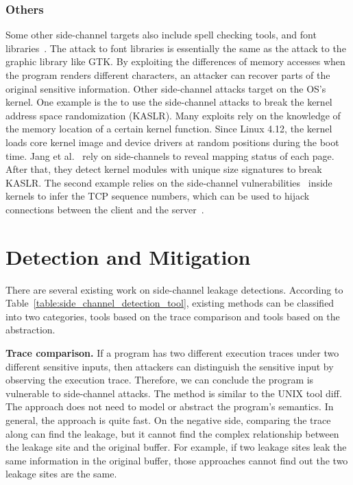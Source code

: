 \subsubsection{Others}
Some other side-channel targets also include spell checking tools, and font libraries~\cite{xu2015controlled}. The attack to font libraries is essentially the same as the attack to the graphic library like GTK. By exploiting the differences of memory accesses when the program renders different characters, an attacker can recover parts of the original sensitive information. Other side-channel attacks target on the OS's kernel. One example is the to use the side-channel attacks to break the kernel address space randomization (KASLR).
Many exploits rely on the knowledge of the memory location of a certain kernel function. Since Linux 4.12, the kernel loads core kernel image and device drivers at random positions during the boot time. Jang et al.~\cite{jang2016breaking} rely on side-channels to reveal mapping status of each page. After that, they detect kernel modules with unique size signatures to break KASLR. The second example relies on the side-channel vulnerabilities~\cite{cao2019principled} inside kernels to infer the TCP sequence numbers, which can be used to hijack connections between the client and the server~\cite{cao2016off}.

\section{Detection and Mitigation}
There are several existing work on side-channel leakage detections. According to Table~\ref{table:side_channel_detection_tool}, existing methods can be classified into two categories, tools based on the trace comparison and tools based on the abstraction.

\textbf{Trace comparison.} If a program has two different execution traces under two different sensitive inputs, then attackers can distinguish the sensitive input by observing the execution trace. Therefore, we can conclude the program is vulnerable to side-channel attacks. The method is similar to the UNIX tool \textsf{diff}.  The approach does not need to model or abstract the program's semantics. In general, the approach is quite fast. On the negative side, comparing the trace along can find the leakage, but it cannot find the complex relationship between the leakage site and the original buffer. For example, if two leakage sites leak the same information in the original buffer, those approaches cannot find out the two leakage sites are the same.


